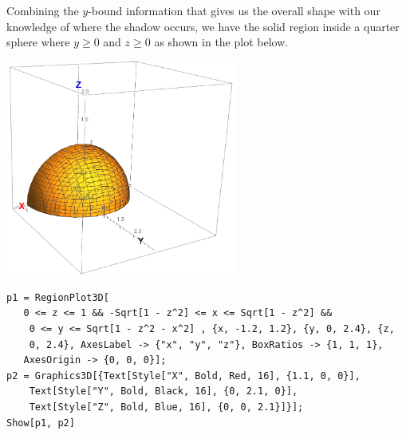 \documentclass[12pt,letterpaper,noanswers]{exam}
\begin{document}
\begin{questions}
\begin{parts}
\begin{solution}
Combining the $y$-bound information that gives us the overall shape with our knowledge of where the shadow occurs, we have the solid region inside a quarter sphere where $y\geq 0$ and $z\geq 0$ as shown in the plot below.

\includegraphics[width=3in]{img/HW06s1.pdf}

\begin{verbatim}
p1 = RegionPlot3D[
   0 <= z <= 1 && -Sqrt[1 - z^2] <= x <= Sqrt[1 - z^2] && 
    0 <= y <= Sqrt[1 - z^2 - x^2] , {x, -1.2, 1.2}, {y, 0, 2.4}, {z, 
    0, 2.4}, AxesLabel -> {"x", "y", "z"}, BoxRatios -> {1, 1, 1}, 
   AxesOrigin -> {0, 0, 0}];
p2 = Graphics3D[{Text[Style["X", Bold, Red, 16], {1.1, 0, 0}], 
    Text[Style["Y", Bold, Black, 16], {0, 2.1, 0}], 
    Text[Style["Z", Bold, Blue, 16], {0, 0, 2.1}]}];
Show[p1, p2]
\end{verbatim}


\end{solution}


\end{parts}


\end{questions}
\end{document}
